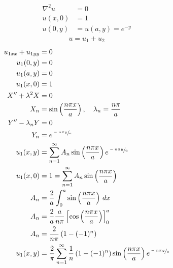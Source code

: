 \documentclass[../../HW08.tex]{subfiles}
\begin{document}
\begin{align*}
    \nabla^{2} u & = 0               \\
    u(x,0)       & = 1               \\
    u(0,y)       & = u(a,y) = e^{-y}
\end{align*}
\begin{gather*}
    u = u_{1} + u_{2}
\end{gather*}
\begin{align*}
    u_{1xx}+u_{1yy}    & = 0                                                                                                                                \\
    u_{1}(0,y)         & = 0                                                                                                                                \\
    u_{1}(a,y)         & = 0                                                                                                                                \\
    u_{1}(x,0)         & = 1                                                                                                                                \\
    X'' + \lambda^{2}X & = 0                                                                                                                                \\
    X_{n}              & = \sin\left( \frac{n\pi x}{a} \right),\quad \lambda_{n}= \frac{n\pi}{a}                                                            \\
    Y''-\lambda_{n}Y   & = 0                                                                                                                                \\
    Y_{n}              & = e^{\sfrac{-n\pi y}{a}}                                                                                                           \\
    u_{1}(x,y)         & = \sum_{n=1}^{\infty}A_{n}\sin\left( \frac{n\pi x}{a} \right)  e^{\sfrac{-n\pi y}{a}}                                              \\
    u_{1}(x,0)         & = 1 = \sum_{n=1}^{\infty}A_{n}\sin\left( \frac{n\pi x}{a} \right)                                                                  \\
    A_{n}              & = \frac{2}{a}\int_{0}^{a}\sin\left( \frac{n\pi x}{a} \right)\,dx                                                                   \\
    A_{n}              & = \frac{2}{a} \frac{a}{n\pi} \left[ \cos\left( \frac{n\pi x}{a} \right) \right]_{0}^{a}                                            \\
    A_{n}              & = \frac{2}{n\pi} \left( 1-(-1)^{n} \right)                                                                                         \\
    u_{1}(x,y)         & = \frac{2}{\pi}\sum_{n=1}^{\infty}\frac{1}{n} \left( 1-(-1)^{n} \right)\sin\left( \frac{n\pi x}{a} \right)  e^{\sfrac{-n\pi y}{a}}
\end{align*}
\end{document}
